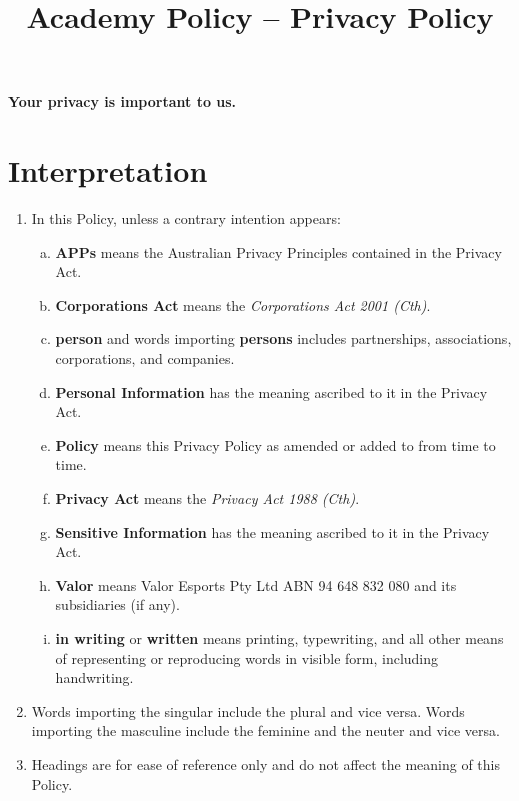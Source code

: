 \documentclass[10pt]{article}
\begin{document}
\title{Academy Policy -- Privacy Policy}

\textbf{Your privacy is important to us.}

\section{Interpretation}

\begin{enumerate}[(1)]
\item 
In this Policy, unless a contrary intention appears:
	\begin{enumerate}[(a)]
	\item
	\textbf{APPs} means the Australian Privacy Principles contained in the Privacy Act.
	
	\item
	\textbf{Corporations Act} means the \textit{Corporations Act 2001 (Cth)}.
	
	\item
	\textbf{person} and words importing \textbf{persons} includes partnerships, associations, corporations, and companies.
	
	\item
	\textbf{Personal Information} has the meaning ascribed to it in the Privacy Act.
	
	\item
	\textbf{Policy} means this Privacy Policy as amended or added to from time to time.
	
	\item
	\textbf{Privacy Act} means the \textit{Privacy Act 1988 (Cth)}.
	
	\item
	\textbf{Sensitive Information} has the meaning ascribed to it in the Privacy Act.
	
	\item
	\textbf{Valor} means Valor Esports Pty Ltd ABN 94 648 832 080 and its subsidiaries (if any).
	
	\item
	\textbf{in writing} or \textbf{written} means printing, typewriting, and all other means of representing or reproducing words in visible form, including handwriting.
	\end{enumerate}

\item
Words importing the singular include the plural and vice versa. Words importing the masculine include the feminine and the neuter and vice versa.

\item
Headings are for ease of reference only and do not affect the meaning of this Policy.
\end{enumerate}
\end{document}
